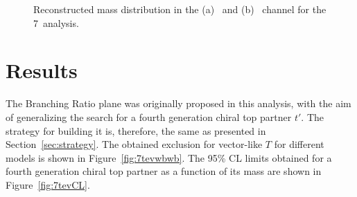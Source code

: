 \begin{figure}[h!tb]\begin{center}
	\caption{Reconstructed mass distribution in the (a) \loose\ and (b) \tight\ 
        channel for the 7\tev\ analysis.\label{fig:7tevmreco}}
\end{center}\end{figure}



\section{Results}

The Branching Ratio plane was originally proposed in
this analysis, with the aim of generalizing the
search for a fourth generation chiral top partner $t'$.
The strategy for building it is, therefore, the same as presented in
Section~\ref{sec:strategy}.
The obtained
exclusion for vector-like $T$ for different models is
shown in Figure~\ref{fig:7tevwbwb}.
The 95\% CL limits obtained for a
fourth generation chiral top partner
as a function of its mass are shown in Figure~\ref{fig:7tevCL}.


